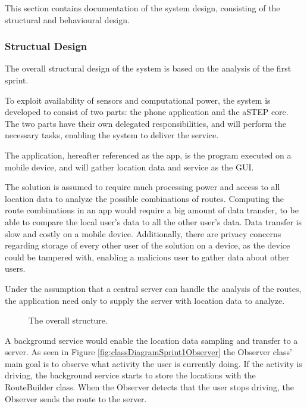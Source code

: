 This section contains documentation of the system design, consisting of the structural and behavioural design.

\subsubsection{Structual Design}
The overall structural design of the system is based on the analysis of the first sprint.

To exploit availability of sensors and computational power, the system is developed to consist of two parts: the phone application and the aSTEP core.
The two parts have their own delegated responsibilities, and will perform the necessary tasks, enabling the system to deliver the service.

The application, hereafter referenced as the app, is the program executed on a mobile device, and will gather location data and service as the GUI. 

The solution is assumed to require much processing power and access to all location data to analyze the possible combinations of routes.
Computing the route combinations in an app would require a big amount of data transfer, to be able to compare the local user's data to all the other user's data.
Data transfer is slow and costly on a mobile device.
Additionally, there are privacy concerns regarding storage of every other user of the solution on a device, as the device could be tampered with, enabling a malicious user to gather data about other users. 

Under the assumption that a central server can handle the analysis of the routes, the application need only to supply the server with location data to analyze.

\begin{figure}[h]
	\centering
	
	\caption{The overall structure.}
	\label{fig:packageDiagramSprint1}
\end{figure}

A background service would enable the location data sampling and transfer to a server.
As seen in Figure \ref{fig:classDiagramSprint1Observer} the Observer class' main goal is to observe what activity the user is currently doing.
If the activity is driving, the background service starts to store the locations with the RouteBuilder class.
When the Observer detects that the user stops driving, the Observer sends the route to the server.

